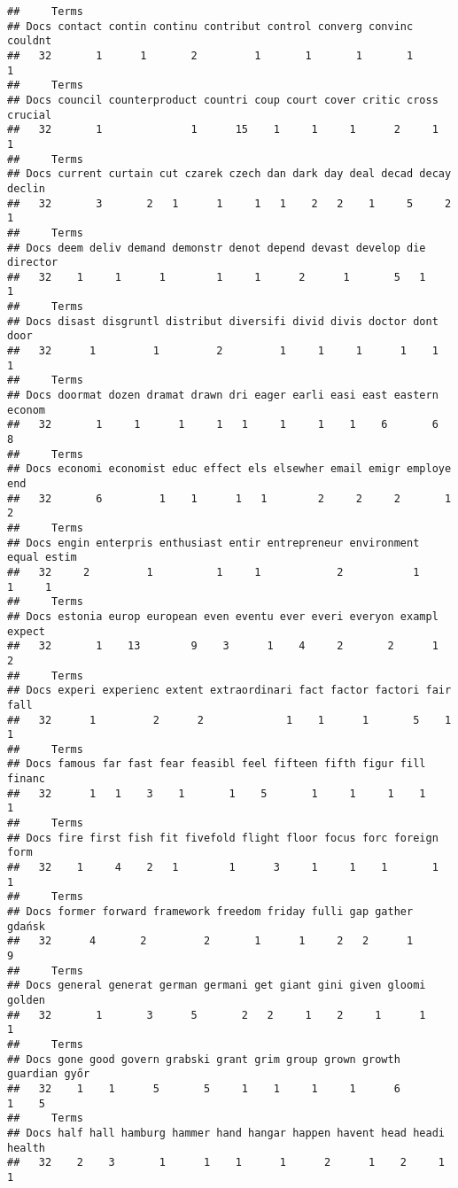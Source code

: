 \documentclass[]{article}
\begin{document}
\begin{verbatim}
##     Terms
## Docs contact contin continu contribut control converg convinc couldnt
##   32       1      1       2         1       1       1       1       1
##     Terms
## Docs council counterproduct countri coup court cover critic cross crucial
##   32       1              1      15    1     1     1      2     1       1
##     Terms
## Docs current curtain cut czarek czech dan dark day deal decad decay declin
##   32       3       2   1      1     1   1    2   2    1     5     2      1
##     Terms
## Docs deem deliv demand demonstr denot depend devast develop die director
##   32    1     1      1        1     1      2      1       5   1        1
##     Terms
## Docs disast disgruntl distribut diversifi divid divis doctor dont door
##   32      1         1         2         1     1     1      1    1    1
##     Terms
## Docs doormat dozen dramat drawn dri eager earli easi east eastern econom
##   32       1     1      1     1   1     1     1    1    6       6      8
##     Terms
## Docs economi economist educ effect els elsewher email emigr employe end
##   32       6         1    1      1   1        2     2     2       1   2
##     Terms
## Docs engin enterpris enthusiast entir entrepreneur environment equal estim
##   32     2         1          1     1            2           1     1     1
##     Terms
## Docs estonia europ european even eventu ever everi everyon exampl expect
##   32       1    13        9    3      1    4     2       2      1      2
##     Terms
## Docs experi experienc extent extraordinari fact factor factori fair fall
##   32      1         2      2             1    1      1       5    1    1
##     Terms
## Docs famous far fast fear feasibl feel fifteen fifth figur fill financ
##   32      1   1    3    1       1    5       1     1     1    1      1
##     Terms
## Docs fire first fish fit fivefold flight floor focus forc foreign form
##   32    1     4    2   1        1      3     1     1    1       1    1
##     Terms
## Docs former forward framework freedom friday fulli gap gather gdańsk
##   32      4       2         2       1      1     2   2      1       9
##     Terms
## Docs general generat german germani get giant gini given gloomi golden
##   32       1       3      5       2   2     1    2     1      1      1
##     Terms
## Docs gone good govern grabski grant grim group grown growth guardian győr
##   32    1    1      5       5     1    1     1     1      6        1    5
##     Terms
## Docs half hall hamburg hammer hand hangar happen havent head headi health
##   32    2    3       1      1    1      1      2      1    2     1      1

\end{verbatim}
\end{document}
